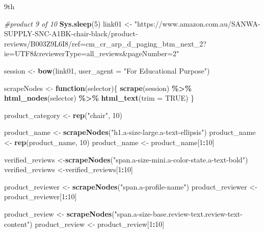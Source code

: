\documentclass[
]{article}
\newenvironment{Shaded}{\begin{snugshade}}{\end{snugshade}}
\newcommand{\AttributeTok}[1]{\textcolor[rgb]{0.13,0.29,0.53}{#1}}
\newcommand{\CommentTok}[1]{\textcolor[rgb]{0.56,0.35,0.01}{\textit{#1}}}
\newcommand{\ConstantTok}[1]{\textcolor[rgb]{0.56,0.35,0.01}{#1}}
\newcommand{\ControlFlowTok}[1]{\textcolor[rgb]{0.13,0.29,0.53}{\textbf{#1}}}
\newcommand{\DecValTok}[1]{\textcolor[rgb]{0.00,0.00,0.81}{#1}}
\newcommand{\FunctionTok}[1]{\textcolor[rgb]{0.13,0.29,0.53}{\textbf{#1}}}
\newcommand{\NormalTok}[1]{#1}
\newcommand{\OtherTok}[1]{\textcolor[rgb]{0.56,0.35,0.01}{#1}}
\newcommand{\SpecialCharTok}[1]{\textcolor[rgb]{0.81,0.36,0.00}{\textbf{#1}}}
\newcommand{\StringTok}[1]{\textcolor[rgb]{0.31,0.60,0.02}{#1}}
\begin{document}
9th

\begin{Shaded}
\begin{Highlighting}[]
\CommentTok{\#product 9 of 10}
  \FunctionTok{Sys.sleep}\NormalTok{(}\DecValTok{5}\NormalTok{)}
\NormalTok{link01 }\OtherTok{\textless{}{-}} \StringTok{"https://www.amazon.com.au/SANWA{-}SUPPLY{-}SNC{-}A1BK{-}chair{-}black/product{-}reviews/B003Z9L6I8/ref=cm\_cr\_arp\_d\_paging\_btm\_next\_2?ie=UTF8\&reviewerType=all\_reviews\&pageNumber=2"}


\NormalTok{  session }\OtherTok{\textless{}{-}} \FunctionTok{bow}\NormalTok{(link01,}
               \AttributeTok{user\_agent =} \StringTok{"For Educational Purpose"}\NormalTok{)}

\NormalTok{  scrapeNodes }\OtherTok{\textless{}{-}} \ControlFlowTok{function}\NormalTok{(selector)\{}
    \FunctionTok{scrape}\NormalTok{(session) }\SpecialCharTok{\%\textgreater{}\%}
      \FunctionTok{html\_nodes}\NormalTok{(selector) }\SpecialCharTok{\%\textgreater{}\%}
      \FunctionTok{html\_text}\NormalTok{(}\AttributeTok{trim =} \ConstantTok{TRUE}\NormalTok{)}
\NormalTok{  \}}

\NormalTok{  product\_category }\OtherTok{\textless{}{-}} \FunctionTok{rep}\NormalTok{(}\StringTok{"chair"}\NormalTok{, }\DecValTok{10}\NormalTok{)}

\NormalTok{  product\_name }\OtherTok{\textless{}{-}} \FunctionTok{scrapeNodes}\NormalTok{(}\StringTok{"h1.a{-}size{-}large.a{-}text{-}ellipsis"}\NormalTok{)}
\NormalTok{  product\_name }\OtherTok{\textless{}{-}} \FunctionTok{rep}\NormalTok{(product\_name, }\DecValTok{10}\NormalTok{)}
\NormalTok{  product\_name }\OtherTok{\textless{}{-}}\NormalTok{ product\_name[}\DecValTok{1}\SpecialCharTok{:}\DecValTok{10}\NormalTok{]}
  
\NormalTok{  verified\_reviews }\OtherTok{\textless{}{-}}\FunctionTok{scrapeNodes}\NormalTok{(}\StringTok{"span.a{-}size{-}mini.a{-}color{-}state.a{-}text{-}bold"}\NormalTok{)}
\NormalTok{  verified\_reviews }\OtherTok{\textless{}{-}}\NormalTok{verified\_reviews[}\DecValTok{1}\SpecialCharTok{:}\DecValTok{10}\NormalTok{]}
  
\NormalTok{  product\_reviewer }\OtherTok{\textless{}{-}} \FunctionTok{scrapeNodes}\NormalTok{(}\StringTok{"span.a{-}profile{-}name"}\NormalTok{)}
\NormalTok{  product\_reviewer }\OtherTok{\textless{}{-}}\NormalTok{ product\_reviewer[}\DecValTok{1}\SpecialCharTok{:}\DecValTok{10}\NormalTok{]}
  
\NormalTok{  product\_review }\OtherTok{\textless{}{-}} \FunctionTok{scrapeNodes}\NormalTok{(}\StringTok{"span.a{-}size{-}base.review{-}text.review{-}text{-}content"}\NormalTok{)}
\NormalTok{  product\_review }\OtherTok{\textless{}{-}}\NormalTok{ product\_review[}\DecValTok{1}\SpecialCharTok{:}\DecValTok{10}\NormalTok{]}
  

\end{Highlighting}
\end{Shaded}
\end{document}
